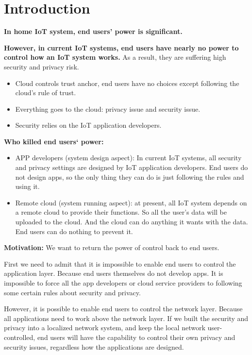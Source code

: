 \section{Introduction}
\textbf{In home IoT system, end users' power is significant.}

\textbf{However, in current IoT systems, end users have nearly no power to control how an IoT system works.} 
As a result, they are suffering high security and privacy risk.
\begin{itemize}
	\item Cloud controls trust anchor, end users have no choices except following the cloud's rule of trust. 
	\item Everything goes to the cloud: privacy issue and security issue.
	\item Security relies on the IoT application developers.
\end{itemize}

\textbf{Who killed end users‘ power: }
\begin{itemize}
	\item APP developers (system design aspect): In current IoT systems, all security and privacy settings are designed by IoT application developers. End users do not design apps, so the only thing they can do is just following the rules and using it.
	\item Remote cloud (system running aspect): at present, all IoT system depends on a remote cloud to provide their functions. So all the user's data will be uploaded to the cloud. And the cloud can do anything it wants with the data. End users can do nothing to prevent it.
\end{itemize}

\textbf{Motivation:} We want to return the power of control back to end users.

First we need to admit that it is impossible to enable end users to control the application layer. Because end users themselves do not develop apps. It is impossible to force all the app developers or cloud service providers to following some certain rules about security and privacy.

However, it is possible to enable end users to control the network layer. Because all applications need to work above the network layer. If we built the security and privacy into a localized network system, and keep the local network user-controlled, end users will have the capability to control their own privacy and security issues, regardless how the applications are designed.

